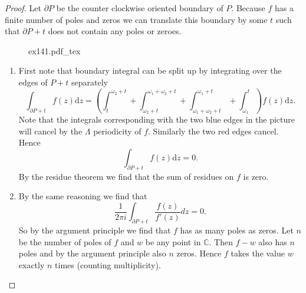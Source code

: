 \documentclass[a4paper]{article}
\newcommand{\incfig}[1]{%
	\def\svgwidth{\columnwidth}
	{#1.pdf_tex}
}
\theoremstyle{theoremdd}
\theoremstyle{definitiondd}
\theoremstyle{remarkdd}
\newcommand{\C}{\mathbb{C}}
\begin{document}
\begin{proof}
	Let $\partial P$ be the counter clockwise oriented boundary of $P$. Because $f$ has a finite number of poles and zeros we can translate this boundary by some $t$ such that $\partial P + t$ does not contain any poles or zeroes.
\begin{figure}[h]
	\incfig{ex141}	
\end{figure}
\begin{enumerate}
	\item First note that boundary integral can be split up by integrating over the edges of $P + t$ separately\[
			\int_{\partial P+ t} f(z) \mathrm d z = \left(\int_t^{\omega_2 + t} + \int_{\omega_2+t}^{\omega_1 + \omega_2 + t} + \int_{\omega_1 + \omega_2 + t} ^{\omega_1 + t} + \int_{\omega_1}^{t}\right) f(z) \mathrm dz
	.\] 
	Note that the integrals corresponding with the two blue edges in the picture will cancel by the $\Lambda$ periodicity of $f$. Similarly the two red edges cancel. 
	Hence \[
		\int_{\partial P + t} f(z) \mathrm d z = 0
	.\] 
	By the residue theorem we find that the sum of residues on $f$ is zero.
	
\item By the same reasoning we find that \[
		\frac{1}{2\pi i}\int_{\partial P + t} \frac{f(z)}{f'(z)}dz = 0
.\] 
So by the argument principle we find that $f$ has as many poles as zeros. Let $n$ be the number of poles of $f$ and $w$ be any point in $\C$. 
Then $f - w$ also has $n$ poles and by the argument principle also $n$ zeros. 
Hence $f$ takes the value $w$ exactly $n$ times (counting multiplicity).


\end{enumerate}
\end{proof}
\end{document}
